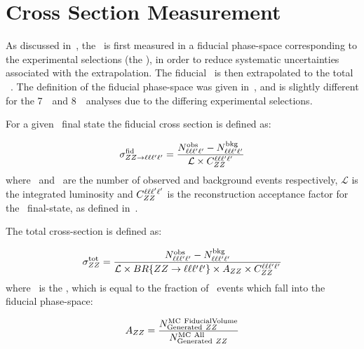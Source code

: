 \section{Cross Section Measurement}

As discussed in~\sec{}, the \cx\ is first measured in a fiducial phase-space
corresponding to the experimental selections (the ), in
order to reduce systematic uncertainties associated with the extrapolation. The
fiducial \cx\ is then extrapolated to the total \ZZ\ \cx. The definition of the
fiducial phase-space was given in~\sec{}, and is slightly different for the
7~\tev\ and 8~\tev\ analyses due to the differing experimental selections.

For a given \ZZllll\ final state the fiducial cross section is defined as:

\begin{equation}\label{eq:xsecfid_fourl}
\sigma_{ZZ\rightarrow\ell\ell\ell'\ell'}^{\rm fid} = \frac{N^{\rm obs}_{\ell\ell\ell'\ell'} - N^{\rm bkg}_{\ell\ell\ell'\ell'}}{\mathcal{L} \times C_{ZZ}^{\ell\ell\ell'\ell'}}
\end{equation}
where \NObs\ and \NBg\ are the number of observed and
background events respectively, $\mathcal{L}$ is the integrated luminosity and
$C_{ZZ}^{\ell\ell\ell'\ell'}$ is the reconstruction acceptance factor for the \lllplp\
final-state, as defined in~.

The total cross-section is defined as:

\begin{equation}\label{eq:xsectot_fourl}
\sigma_{ZZ}^{\rm tot} = \frac{ N^{\rm obs}_{\ell\ell\ell'\ell'} - N^{\rm bkg}_{\ell\ell\ell'\ell'}}{\mathcal{L} \times
BR\{ZZ\rightarrow\ell\ell\ell'\ell'\} \times A_{ZZ} \times C_{ZZ}^{\ell\ell\ell'\ell'}}
\end{equation}
where \AZZ\ is the , which is equal to the
fraction of \ZZ\ events which fall into the fiducial phase-space:

\begin{equation}
A_{ZZ} = \frac{ N^{\rm MC\ Fiducial Volume}_{{\rm Generated}\ ZZ} }{ N^{{\rm MC\
All}}_{{\rm Generated}\ ZZ} }
\end{equation}


